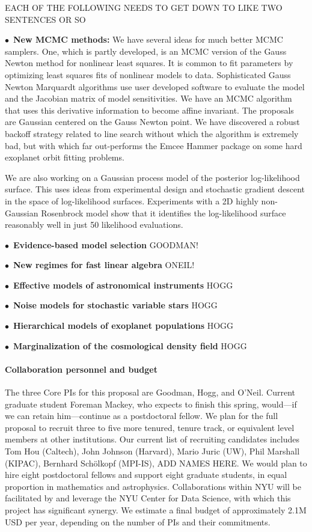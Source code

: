 \documentclass[12pt]{article}
\newcommand{\hoggitem}{$\bullet$}
\begin{document}
EACH OF THE FOLLOWING NEEDS TO GET DOWN TO LIKE TWO SENTENCES OR SO

\hoggitem~\textbf{New MCMC methods:}
We have several ideas for much better MCMC samplers.
One, which is partly developed, is an MCMC version of the Gauss Newton method for
nonlinear least squares.
It is common to fit parameters by optimizing least squares fits of nonlinear models to data.
Sophisticated Gauss Newton Marquardt algorithms use user developed software to evaluate the 
model and the Jacobian matrix of model sensitivities.
We have an MCMC algorithm that uses this derivative information to become affine invariant.
The proposals are Gaussian centered on the Gauss Newton point.
We have discovered a robust backoff strategy related to line search without which the 
algorithm is extremely bad, but with which far out-performs the Emcee Hammer package on 
some hard exoplanet orbit fitting problems.

We are also working on a Gaussian process model of the posterior log-likelihood surface.
This uses ideas from experimental design and stochastic gradient descent in the space of
log-likelihood surfaces.
Experiments with a 2D highly non-Gaussian Rosenbrock model show that it identifies
the log-likelihood surface reasonably well in just 50 likelihood evaluations.

\hoggitem~\textbf{Evidence-based model selection} GOODMAN!

\hoggitem~\textbf{New regimes for fast linear algebra} ONEIL!

\hoggitem~\textbf{Effective models of astronomical instruments} HOGG

\hoggitem~\textbf{Noise models for stochastic variable stars} HOGG

\hoggitem~\textbf{Hierarchical models of exoplanet populations} HOGG

\hoggitem~\textbf{Marginalization of the cosmological density field} HOGG

\paragraph{Collaboration personnel and budget}

The three Core PIs for this proposal are Goodman, Hogg, and O'Neil.
Current graduate student Foreman Mackey, who expects to finish this spring,
would---if we can retain him---continue as a postdoctoral fellow.
We plan for the full proposal to recruit three to five more tenured,
tenure track, or equivalent level members at other institutions.
Our current list of recruiting candidates includes Tom Hou (Caltech),
John Johnson (Harvard), Mario Juric (UW), Phil Marshall (KIPAC),
Bernhard Sch\"olkopf (MPI-IS), ADD NAMES HERE.
We would plan to hire eight postdoctoral fellows and support eight
graduate students, in equal proportion in mathematics and
astrophysics.
Collaborations within NYU will be facilitated by and leverage the NYU
Center for Data Science, with which this project has significant
synergy.
We estimate a final budget of approximately 2.1M USD per year,
depending on the number of PIs and their commitments.
\end{document}
